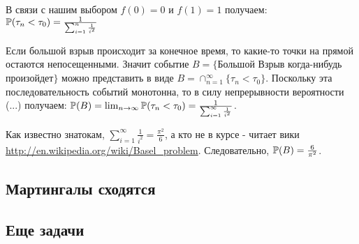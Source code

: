 {\begin{myex}
В связи с нашим выбором $f(0)=0$ и $f(1)=1$ получаем: $\P(\tau_{n}<\tau_{0})=\frac{1}{\sum_{i=1}^{n}\frac{1}{i^{2}}}$

Если большой взрыв происходит за конечное время, то какие-то точки на прямой остаются непосещенными. Значит событие $B=\{$Большой Взрыв когда-нибудь произойдет$\}$ можно представить в виде $B=\cap_{n=1}^{\infty}\{\tau_{n}<\tau_{0}\}$. Поскольку эта последовательность событий монотонна, то в силу непрерывности вероятности (...) получаем: $\P(B)=\lim_{n\to\infty}\P(\tau_{n}<\tau_{0})=\frac{1}{\sum_{i=1}^{\infty}\frac{1}{i^{2}}}$.

Как известно знатокам, $\sum_{i=1}^{\infty}\frac{1}{i^{2}}=\frac{\pi^{2}}{6}$, а кто не в курсе - читает вики \url{http://en.wikipedia.org/wiki/Basel_problem}. Следовательно,
$\P(B)=\frac{6}{\pi^{2}}$.

\end{myex}


\begin{myex}


\end{myex}




}\subsection{Мартингалы сходятся} \problemtext{

}\subsection{Еще задачи}

